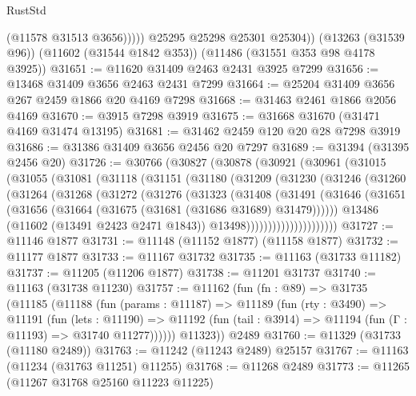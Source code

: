 \begin{lexlean}{RustStd}
\begin{coremodule}
                (@11578 @31513 @3656)))))
        @25295
        @25298
        @25301
        @25304))
    (@13263 (@31539 @96))
    (@11602 (@31544 @1842 @353))
    (@11486 (@31551 @353 @98 @4178 @3925))
@31651 := @11620 @31409 @2463 @2431 @3925 @7299
@31656 := @13468 @31409 @3656 @2463 @2431 @7299
@31664 := @25204 @31409 @3656 @267 @2459 @1866 @20 @4169 @7298
@31668 := @31463 @2461 @1866 @2056 @4169
@31670 := @3915 @7298 @3919
@31675 := @31668 @31670 (@31471 @4169 @31474 @13195)
@31681 := @31462 @2459 @120 @20 @28 @7298 @3919
@31686 := @31386 @31409 @3656 @2456 @20 @7297
@31689 := @31394 (@31395 @2456 @20)
@31726 := @30766
    (@30827
      (@30878
        (@30921
          (@30961
            (@31015
              (@31055
                (@31081
                  (@31118
                    (@31151
                      (@31180
                        (@31209
                          (@31230
                            (@31246
                              (@31260
                                (@31264
                                  (@31268
                                    (@31272
                                      (@31276
                                        (@31323
                                          (@31408
                                            (@31491
                                              (@31646
                                                (@31651
                                                  (@31656
                                                    (@31664
                                                      (@31675 (@31681 (@31686 @31689) @31479))))))
                                              @13486
                                              (@11602 (@13491 @2423 @2471 @1843))
                                              @13498)))))))))))))))))))))
@31727 := @11146 @1877
@31731 := @11148 (@11152 @1877) (@11158 @1877)
@31732 := @11177 @1877
@31733 := @11167 @31732
@31735 := @11163 (@31733 @11182)
@31737 := @11205 (@11206 @1877)
@31738 := @11201 @31737
@31740 := @11163 (@31738 @11230)
@31757 := @11162
    (fun (fn : @89) =>
    @31735
      (@11185
        (@11188
          (fun (params : @11187) =>
          @11189
            (fun (rty : @3490) =>
            @11191
              (fun (lets : @11190) =>
              @11192 (fun (tail : @3914) => @11194 (fun (Γ : @11193) => @31740 @11277))))))
        @11323))
    @2489
@31760 := @11329 (@31733 (@11180 @2489))
@31763 := @11242 (@11243 @2489) @25157
@31767 := @11163 (@11234 (@31763 @11251) @11255)
@31768 := @11268 @2489
@31773 := @11265 (@11267 @31768 @25160 @11223 @11225)

\end{coremodule}
\end{lexlean}
